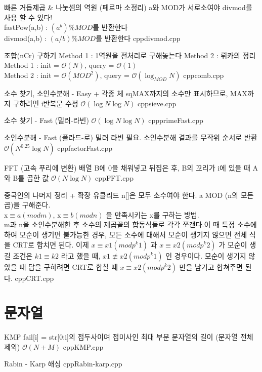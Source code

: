\documentclass[landscape, 10pt, a4paper, oneside, twocolumn]{extarticle}
\begin{document}
\Algorithm
{빠른 거듭제곱 \& 나눗셈의 역원 (페르마 소정리)}
{a와 MOD가 서로소여야 divmod를 사용 할 수 있다!\\
fastPow(a,b) : ${(a^b)\%MOD}$를 반환한다\\
divmod(a,b) : ${(a/b)\%MOD}$를 반환한다
}
{}
{cpp}{divmod.cpp}

\Algorithm
{조합(nCr) 구하기}
{Method 1 : 1 역원을 전처리로 구해놓는다
Method 2 : 뤼카의 정리
}
{Method 1 : init = $\mathcal{O}(N)$, query = $\mathcal{O}(1)$\\
Method 2 : init = $\mathcal{O}(MOD^2)$, query = $\mathcal{O}(\log_{MOD}N)$}
{cpp}{comb.cpp}

\Algorithm
{소수 찾기, 소인수분해 - Easy + 각종 체}
{sqMAX까지의 소수만 표시하므로, MAX까지 구하려면 i반복문 수정
}
{$\mathcal{O}(\log{N}\log{N})$}
{cpp}{sieve.cpp}

\Algorithm
{소수 찾기 - Fast (밀러-라빈)}
{
}
{$\mathcal{O}(\log{N}\log{N})$}
{cpp}{primeFast.cpp}

\Algorithm
{소인수분해 - Fast (폴라드-로)}
{밀러 라빈 필요. 소인수분해 결과를 무작위 순서로 반환}
{$\mathcal{O}(N^{0.25}\log{N})$}
{cpp}{factorFast.cpp}

\Algorithm
{FFT (고속 푸리에 변환)}
{배열 B에 0을 채워넣고 뒤집은 후, B의 꼬리가 i에 있을 때 A와 B를 곱한 값}
{$\mathcal{O}(N\log{N})$}
{cpp}{FFT.cpp}

\Algorithm
{중국인의 나머지 정리 + 확장 유클리드}
{n[]은 모두 소수여야 한다. a MOD (n의 모든 곱)을 구해준다.\\
x$\equiv{a}(mod m)$, x$\equiv{b}(mod n)$ 을 만족시키는 x를 구하는 방법.\\
m과 n을 소인수분해한 후 소수의 제곱꼴의 합동식들로 각각 쪼갠다.이 때 특정 소수에 하여 모순이 생기면 불가능한 경우, 모든 소수에 대해서 모순이 생기지 않으면 전체 식을 CRT로 합치면 된다. 이제 $x\equiv x1 (mod p^k1 )$ 과 $x\equiv x2 (mod p^k2 )$ 가 모순이 생길 조건은 $k1\equiv k2$ 라고 했을 때, $x1\not\equiv x2 (mod p^k1)$ 인 경우이다. 모순이 생기지 않았을 때 답을 구하려면 CRT로 합칠 때 $x\equiv  x2 (mod p^k2 )$ 만을 남기고 합쳐주면 된다.
}
{}
{cpp}{CRT.cpp}

\section{문자열}

\Algorithm
{KMP}
{fail[i] = str[0:i]의 접두사이며 접미사인 최대 부분 문자열의 길이 (문자열 전체 제외)}
{$\mathcal{O}(N+M)$}
{cpp}{KMP.cpp}

\Algorithm
{Rabin - Karp 해싱}
{}
{}
{cpp}{Rabin-karp.cpp}
\end{document}
